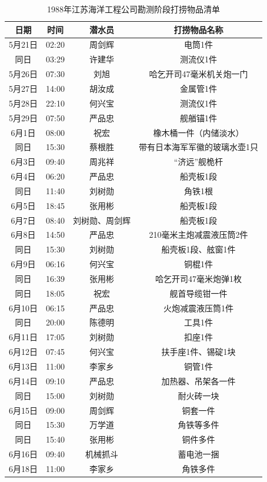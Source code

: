 \documentclass[12pt,UTF8]{ctexbook}
\begin{document}
\begin{table}[]
\centering
\label{tab:标签}
\caption{1988年江苏海洋工程公司勘测阶段打捞物品清单}
\begin{tabular}{|c|c|c|c|}
	\hline
	日期    & 时间  & 潜水员   & 打捞物品名称 \\ \hline
	5月21日 & 02:20 & 周剑辉   & 电筒1件  \\ \hline
	同日    & 03:29 & 许建华   & 测流仪1件   \\ \hline
	5月26日 & 07:30 & 刘旭     & 哈乞开司47毫米机关炮一门 \\ \hline
	5月27日 & 14:00 & 胡汝成   & 金属管1件 \\ \hline
	5月28日 & 22:10 & 何兴宝   & 测流仪1件 \\ \hline
	5月29日 & 07:50 & 严品忠   & 舰艏锚1件 \\ \hline
	6月1日  & 08:00 & 祝宏     &橡木桶一件（内储淡水） \\ \hline
	同日    & 15:30 & 蔡根胜   &带有日本海军军徽的玻璃水壶1只 \\ \hline
	6月3日  & 09:40 & 周兆祥   &“济远”舰桅杆 \\ \hline
	6月4日  & 06:20 & 严品忠   &船壳板1段 \\ \hline
	同日    & 11:40 & 刘树勋   &角铁1根 \\ \hline
	6月5日  & 18:45 & 张用彬   &船壳板1段 \\ \hline
	6月7日  & 08:40 & 刘树勋、周剑辉 & 船壳板1段 \\ \hline
	6月8日  & 14:50 & 严品忠   &210毫米主炮减震液压筒2件 \\ \hline
	同日    & 15:30 & 刘树勋   &船壳板1段、舷窗1件 \\ \hline
	6月9日  & 06:16 & 何兴宝   &铜棍1件 \\ \hline
	同日    & 16:39 & 张用彬   &哈乞开司47毫米炮弹1枚 \\ \hline
	同日    & 18:05 & 祝宏     &舰首导缆钳一件 \\ \hline
	6月10日 & 06:15 & 严品忠   &火炮减震液压筒1件 \\ \hline
	同日    & 20:00 & 陈德明   &工具1件 \\ \hline
	6月11日 & 17:05 & 刘树勋   &扣座1件 \\ \hline
	6月12日 & 07:45 & 何兴宝   &扶手座1件、锡碇1块 \\ \hline
	6月13日 & 11:00 & 李家乡   &铜管1件 \\ \hline
	6月14日 & 09:10 & 严品忠   &加热器、吊架各一件 \\ \hline
	同日    & 15:00 & 刘树勋   &耐火砖一块 \\ \hline
	6月15日 & 09:00 & 周剑辉   &铜套一件 \\ \hline
	同日    & 15:30 & 万学道   &角铁等多件 \\ \hline
	同日    & 15:40 & 张用彬   &  铜件多件 \\ \hline
	6月16日 & 09:40 & 机械抓斗 & 蓄电池一捆 \\ \hline
	6月18日 & 11:00 & 李家乡   &  角铁多件 \\ \hline
\end{tabular}
\end{table}
\end{document}
